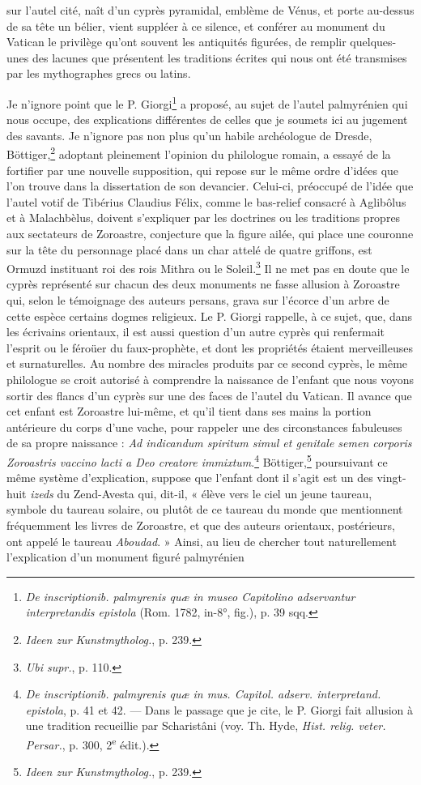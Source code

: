 \documentclass[a4paper, 11pt, oneside, polutonikogreek, french]{article}
\begin{document}
sur l'autel cité, naît d'un cyprès pyramidal, emblème de Vénus, et porte au-dessus de sa tête un bélier, vient suppléer à ce silence, et conférer au monument du Vatican le privilège qu'ont souvent les antiquités figurées, de remplir quelques-unes des lacunes que présentent les traditions écrites qui nous ont été transmises par les mythographes grecs ou latins.

Je n'ignore point que le P. Giorgi\footnote{\emph{De inscriptionib. palmyrenis quæ in museo Capitolino adservantur interpretandis epistola} (Rom. 1782, in-8°, fig.), p. 39 sqq.} a proposé, au sujet de l'autel palmyrénien qui nous occupe, des explications différentes de celles que je soumets ici au jugement des savants. Je n'ignore pas non plus qu'un habile archéologue de Dresde, Böttiger,\footnote{\emph{Ideen zur Kunstmytholog.}, p. 239.} adoptant pleinement l'opinion du philologue romain, a essayé de la fortifier par une nouvelle supposition, qui repose sur le même ordre d'idées que l'on trouve dans la dissertation de son devancier. Celui-ci, préoccupé de l'idée que l'autel votif de Tibérius Claudius Félix, comme le bas-relief consacré à Aglibôlus et à Malachbèlus, doivent s'expliquer par les doctrines ou les traditions propres aux sectateurs de Zoroastre, conjecture que la figure ailée, qui place une couronne sur la tête du personnage placé dans un char attelé de quatre griffons, est Ormuzd instituant roi des rois Mithra ou le Soleil.\footnote{\emph{Ubi supr.}, p. 110.} Il ne met pas en doute que le cyprès représenté sur chacun des deux monuments ne fasse allusion à Zoroastre qui, selon le témoignage des auteurs persans, grava sur l'écorce d'un arbre de cette espèce certains dogmes religieux. Le P. Giorgi rappelle, à ce sujet, que, dans les écrivains orientaux, il est aussi question d'un autre cyprès qui renfermait l'esprit ou le féroüer du faux-prophète, et dont les propriétés étaient merveilleuses et surnaturelles. Au nombre des miracles produits par ce second cyprès, le même philologue se croit autorisé à comprendre la naissance de l'enfant que nous voyons sortir des flancs d'un cyprès sur une des faces de l'autel du Vatican. Il avance que cet enfant est Zoroastre lui-même, et qu'il tient dans ses mains la portion antérieure du corps d'une vache, pour rappeler une des circonstances fabuleuses de sa propre naissance : \emph{Ad indicandum spiritum simul et genitale semen corporis Zoroastris vaccino lacti a Deo creatore immixtum}.\footnote{\emph{De inscriptionib. palmyrenis quæ in mus. Capitol. adserv. interpretand. epistola}, p. 41 et 42. --- Dans le passage que je cite, le P. Giorgi fait allusion à une tradition recueillie par Scharistâni (voy. Th. Hyde, \emph{Hist. relig. veter. Persar.}, p. 300, 2\textsuperscript{e} édit.).} Böttiger,\footnote{\emph{Ideen zur Kunstmytholog.}, p. 239.} poursuivant ce même système d'explication, suppose que l'enfant dont il s'agit est un des vingt-huit \emph{izeds} du Zend-Avesta qui, dit-il, « élève vers le ciel un jeune taureau, symbole du taureau solaire, ou plutôt de ce taureau du monde que mentionnent fréquemment les livres de Zoroastre, et que des auteurs orientaux, postérieurs, ont appelé le taureau \emph{Aboudad}. » Ainsi, au lieu de chercher tout naturellement l'explication d'un monument figuré palmyrénien 
\end{document}
